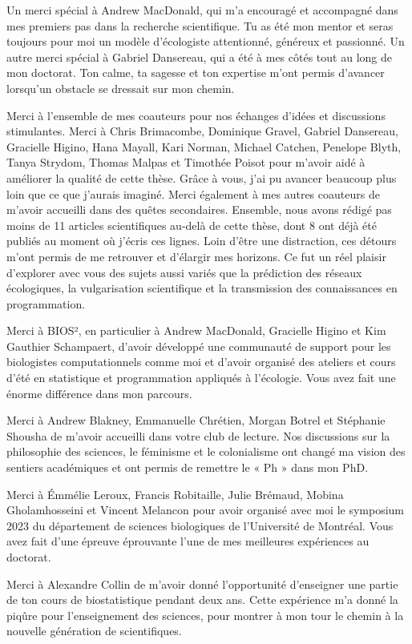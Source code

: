 \documentclass[12pt,twoside,phd]{dms}
\numberwithin{equation}{section}
\numberwithin{table}{chapter}
\numberwithin{figure}{chapter}
\begin{document}
Un merci spécial à Andrew MacDonald, qui m'a encouragé et accompagné dans mes
premiers pas dans la recherche scientifique. Tu as été mon mentor et seras
toujours pour moi un modèle d'écologiste attentionné, généreux et passionné. Un
autre merci spécial à Gabriel Dansereau, qui a été à mes côtés tout au long de
mon doctorat. Ton calme, ta sagesse et ton expertise m'ont permis d'avancer
lorsqu'un obstacle se dressait sur mon chemin.

Merci à l'ensemble de mes coauteurs pour nos échanges d'idées et discussions
stimulantes. Merci à Chris Brimacombe, Dominique Gravel, Gabriel Dansereau,
Gracielle Higino, Hana Mayall, Kari Norman, Michael Catchen, Penelope Blyth,
Tanya Strydom, Thomas Malpas et Timothée Poisot pour m'avoir aidé à améliorer la
qualité de cette thèse. Grâce à vous, j'ai pu avancer beaucoup plus loin que ce
que j'aurais imaginé. Merci également à mes autres coauteurs de m'avoir
accueilli dans des quêtes secondaires. Ensemble, nous avons rédigé pas moins de
11 articles scientifiques au-delà de cette thèse, dont 8 ont déjà été publiés au
moment où j'écris ces lignes. Loin d'être une distraction, ces détours m'ont
permis de me retrouver et d'élargir mes horizons. Ce fut un réel plaisir
d'explorer avec vous des sujets aussi variés que la prédiction des réseaux
écologiques, la vulgarisation scientifique et la transmission des connaissances
en programmation.

Merci à BIOS², en particulier à Andrew MacDonald, Gracielle Higino et Kim
Gauthier Schampaert, d'avoir développé une communauté de support pour les
biologistes computationnels comme moi et d'avoir organisé des ateliers et cours
d'été en statistique et programmation appliqués à l'écologie. Vous avez fait une
énorme différence dans mon parcours.

Merci à Andrew Blakney, Emmanuelle Chrétien, Morgan Botrel et Stéphanie Shousha
de m'avoir accueilli dans votre club de lecture. Nos discussions sur la
philosophie des sciences, le féminisme et le colonialisme ont changé ma vision
des sentiers académiques et ont permis de remettre le « Ph » dans mon PhD. 

Merci à Émmélie Leroux, Francis Robitaille, Julie Brémaud, Mobina Gholamhosseini
et Vincent Melancon pour avoir organisé avec moi le symposium 2023 du
département de sciences biologiques de l'Université de Montréal. Vous avez fait
d'une épreuve éprouvante l'une de mes meilleures expériences au doctorat.

Merci à Alexandre Collin de m'avoir donné l'opportunité d'enseigner une partie
de ton cours de biostatistique pendant deux ans. Cette expérience m'a donné la
piqûre pour l'enseignement des sciences, pour montrer à mon tour le chemin à la
nouvelle génération de scientifiques.
\end{document}
